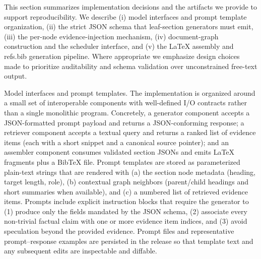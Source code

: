 This section summarizes implementation decisions and the artifacts we provide to support reproducibility. We describe (i) model interfaces and prompt template organization, (ii) the strict JSON schema that leaf-section generators must emit, (iii) the per-node evidence-injection mechanism, (iv) document-graph construction and the scheduler interface, and (v) the LaTeX assembly and refs.bib generation pipeline. Where appropriate we emphasize design choices made to prioritize auditability and schema validation over unconstrained free-text output.

Model interfaces and prompt templates.
The implementation is organized around a small set of interoperable components with well-defined I/O contracts rather than a single monolithic program. Concretely, a generator component accepts a JSON-formatted prompt payload and returns a JSON-conforming response; a retriever component accepts a textual query and returns a ranked list of evidence items (each with a short snippet and a canonical source pointer); and an assembler component consumes validated section JSONs and emits LaTeX fragments plus a BibTeX file. Prompt templates are stored as parameterized plain-text strings that are rendered with (a) the section node metadata (heading, target length, role), (b) contextual graph neighbors (parent/child headings and short summaries when available), and (c) a numbered list of retrieved evidence items. Prompts include explicit instruction blocks that require the generator to (1) produce only the fields mandated by the JSON schema, (2) associate every non-trivial factual claim with one or more evidence item indices, and (3) avoid speculation beyond the provided evidence. Prompt files and representative prompt–response examples are persisted in the release so that template text and any subsequent edits are inspectable and diffable.

